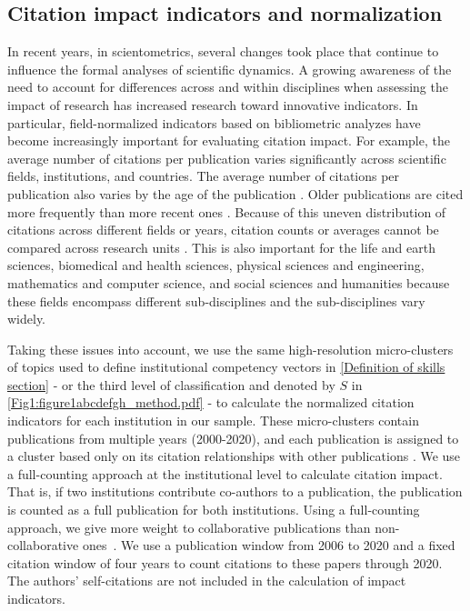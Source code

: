 \documentclass[draft,final]{vutinfth} %
\begin{document}
\subsection{Citation impact indicators and normalization}
\label{impact indicators}
In recent years, in scientometrics, several changes took place that continue to influence the formal analyses of scientific dynamics. A growing awareness of the need to account for differences across and within disciplines when assessing the impact of research has increased research toward innovative indicators. In particular, field-normalized indicators based on bibliometric analyzes have become increasingly important for evaluating citation impact. For example, the average number of citations per publication varies significantly across scientific fields, institutions, and countries. The average number of citations per publication also varies by the age of the publication \cite{waltman2011towards}. Older publications are cited more frequently than more recent ones \cite{reisz2022loss}. Because of this uneven distribution of citations across different fields or years, citation counts or averages cannot be compared across research units \cite{waltman2011towards}. This is also important for the life and earth sciences, biomedical and health sciences, physical sciences and engineering, mathematics and computer science, and social sciences and humanities because these fields encompass different sub-disciplines and the sub-disciplines vary widely.

Taking these issues into account, we use the same high-resolution micro-clusters of topics used to define institutional competency vectors in \ref{Definition of skills section} - or the third level of classification and denoted by $S$ in \ref{Fig1:figure1abcdefgh_method.pdf} - to calculate the normalized citation indicators for each institution in our sample. These micro-clusters contain publications from multiple years (2000-2020), and each publication is assigned to a cluster based only on its citation relationships with other publications \cite{traag2019louvain}. We use a full-counting approach at the institutional level to calculate citation impact. That is, if two institutions contribute co-authors to a publication, the publication is counted as a full publication for both institutions. Using a full-counting approach, we give more weight to collaborative publications than non-collaborative ones~\cite{waltman2012new}. We use a publication window from 2006 to 2020 and a fixed citation window of four years to count citations to these papers through 2020. The authors' self-citations are not included in the calculation of impact indicators.
\end{document}
